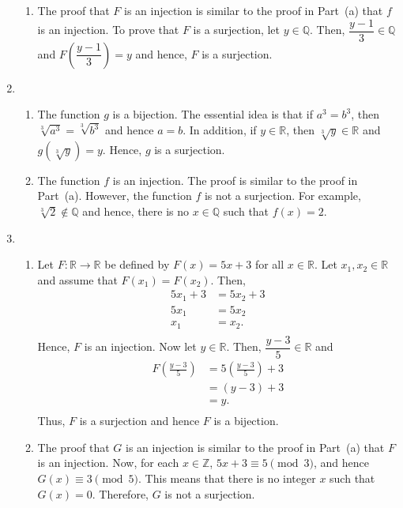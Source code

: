 \begin{enumerate}
\begin{enumerate}
\item The proof that $F$ is an injection is similar to the proof in Part~(a) that $f$ is an injection.  To prove that $F$ is a surjection, let $y \in \mathbb{Q}$.  Then, 
$\dfrac{y-1}{3} \in \mathbb{Q}$ and $F \left( \dfrac{y-1}{3} \right) = y$ and hence, $F$ is a surjection.
\end{enumerate}


\item \begin{enumerate}
\item The function $g$ is a bijection.  The essential idea is that if $a^3 = b^3$, then 
$\sqrt[3]{a^3} = \sqrt[3]{b^3}$ and hence $a = b$.  In addition, if $y \in \mathbb{R}$, then 
$\sqrt[3]{y} \in \mathbb{R}$ and $g ( \sqrt[3]{y} ) = y$.  Hence, $g$ is a surjection.

\item The function $f$ is an injection.  The proof is similar to the proof in Part~(a).  However, the function $f$ is not a surjection.  For example, $\sqrt[3]{2} \notin \mathbb{Q}$ and hence, there is no $x \in \mathbb{Q}$ such that $f ( x ) = 2$.
\end{enumerate}



\item \begin{enumerate}
\item Let $F: \mathbb{R} \to \mathbb{R}$ be defined by $F ( x ) = 5x + 3$ for all 
$x \in \mathbb{R}$.  Let  $x_1, x_2 \in \mathbb{R}$ and assume that 
$F ( x_1 ) = F ( x_2 )$.  Then,
\[
\begin{aligned}
5x_1 + 3 &= 5x_2 + 3 \\
    5x_1 &= 5x_2 \\
     x_1 &= x_2. \\
\end{aligned}
\]
Hence, $F$ is an injection.  Now let $y \in \mathbb{R}$.  Then, $\dfrac{y - 3}{5} \in \mathbb{R}$ and 
\[
\begin{aligned}
F \left( \frac{y - 3}{5} \right) &= 5 \left( \frac{y - 3}{5} \right) + 3 \\
                         &= ( y - 3 ) + 3 \\
                         &= y. \\
\end{aligned}
\]
Thus, $F$ is a surjection and hence $F$ is a bijection.


\item The proof that $G$ is an injection is similar to the proof in Part~(a) that $F$ is an injection.  Now, for each $x \in \mathbb{Z}$, $5x + 3 \equiv 5 \pmod 3$, and hence 
$G ( x ) \equiv 3 \pmod 5$.  This means that there is no integer $x$ such that 
$G ( x ) = 0$.  Therefore, $G$ is not a surjection.


\end{enumerate}
\end{enumerate}
